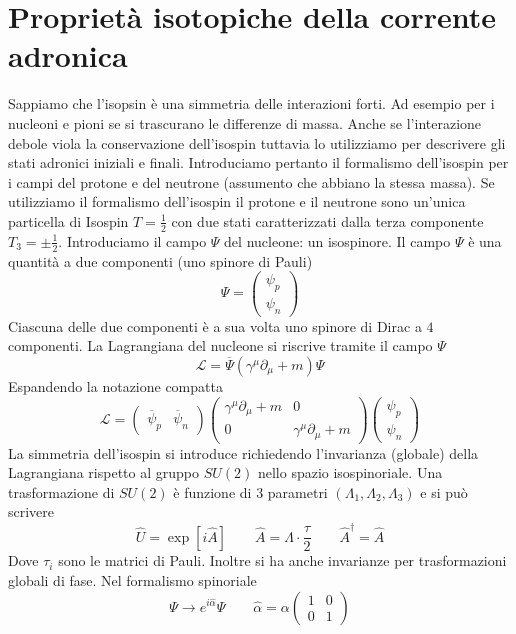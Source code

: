 \section{Proprietà isotopiche della corrente adronica}
Sappiamo che l'isopsin è una simmetria delle interazioni forti. Ad esempio per i nucleoni e pioni se si trascurano le differenze di massa. Anche se l'interazione debole viola la conservazione dell'isospin tuttavia lo utilizziamo per descrivere gli stati adronici iniziali e finali. Introduciamo pertanto il formalismo dell'isospin per i campi del protone e del neutrone (assumento che abbiano la stessa massa). Se utilizziamo il formalismo dell'isospin il protone e il neutrone sono un'unica particella di Isospin $T=\frac{1}{2}$ con due stati caratterizzati dalla terza componente $T_3=\pm\frac{1}{2}$. Introduciamo il campo $\Psi$ del nucleone: un isospinore. Il campo $\Psi$ è una quantità a due componenti (uno spinore di Pauli)
$$
\Psi = \begin{pmatrix} \psi_p \\ \psi_n \end{pmatrix}
$$
Ciascuna delle due componenti è a sua volta uno spinore di Dirac a $4$ componenti. La Lagrangiana del nucleone si riscrive tramite il campo $\Psi$
$$
\mathcal{L} = \overline{\Psi} (\gamma^\mu \partial_\mu + m) \Psi
$$
Espandendo la notazione compatta
$$
\mathcal{L} = \begin{pmatrix} \overline{\psi}_p & \overline{\psi}_n \end{pmatrix} \begin{pmatrix} \gamma^\mu \partial_\mu + m & 0 \\ 0 & \gamma^\mu \partial_\mu + m \end{pmatrix} \begin{pmatrix} \psi_p \\ \psi_n \end{pmatrix}
$$
La simmetria dell'isospin si introduce richiedendo l'invarianza (globale) della Lagrangiana rispetto al gruppo $SU(2)$ nello spazio isospinoriale. Una trasformazione di $SU(2)$ è funzione di $3$ parametri $(\Lambda_1, \Lambda_2, \Lambda_3)$ e si può scrivere
$$
\widehat{U} = \exp[i\widehat{A}] \quad \quad \widehat{A} = \Lambda \cdot \frac{\widehat{\tau}}{2} \quad \quad \widehat{A}^\dagger = \widehat{A}
$$
Dove $\tau_i$ sono le matrici di Pauli. Inoltre si ha anche invarianze per trasformazioni globali di fase. Nel formalismo spinoriale
$$
\Psi \to e^{i\widehat{\alpha}} \Psi \quad \quad \widehat{\alpha} = \alpha \begin{pmatrix} 1 & 0 \\ 0 & 1 \end{pmatrix}
$$

